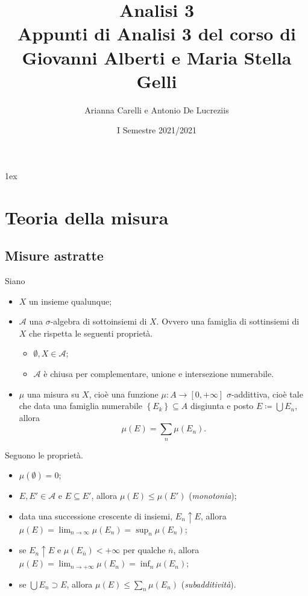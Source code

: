 \documentclass[a4paper, 11pt]{report}
\title{{\Huge Analisi 3}\\{\small Appunti di Analisi 3 del corso di Giovanni Alberti e Maria Stella Gelli}}
\author{Arianna Carelli e Antonio De Lucreziis}
\date{I Semestre 2021/2021}
\begin{document}
%
%
\parskip 1ex
\setlength{\parindent}{0pt}

\maketitle

\tableofcontents
\newpage

\chapter{Teoria della misura}

\section{Misure astratte}
Siano
\begin{itemize}
	\item $X$ un insieme qualunque;
	\item $\mathcal{A}$ una $\sigma$-algebra di sottoinsiemi di $X$. Ovvero una famiglia di sottinsiemi di $X$ che rispetta le seguenti proprietà.
		\begin{itemize}
			\item $\emptyset, X \in \mathcal{A}$;
			\item $\mathcal{A}$ è chiusa per complementare, unione e intersezione numerabile.
			\end{itemize}
	\item $\mu$ una misura su $X$, cioè una funzione $\mu \colon A \to [0,+\infty]$ $\sigma$-addittiva, cioè tale che data una famiglia numerabile $\left\{ E_k \right\} \subseteq A$ disgiunta e posto $E \coloneqq \bigcup E_n $, allora
	\[
		\mu(E) = \sum_{n} \mu (E_n).
	\] 
\end{itemize}
%
Seguono le proprietà.
\begin{itemize}
	\item $\mu(\emptyset) = 0$;
	\item $E,E' \in \mathcal{A}$ e $E \subseteq E'$, allora $\mu(E) \leq \mu(E')$ (\textit{monotonia});
	\item data una successione crescente di insiemi, $E_n \uparrow E$, allora $\mu(E) = \lim_{n \to \infty} \mu(E_n) = \sup_{n} \mu(E_n)$;
	\item se $E_n \uparrow E$ e $\mu (E_{\overline{n}}) < +\infty$ per qualche $\overline{n}$, allora $\mu(E) = \lim_{n \to + \infty} \mu(E_n) = \inf_{n} \mu(E_n)$;
	\item se $\bigcup E_n \supset E$, allora $\mu(E) \leq \sum_{n}^{} \mu(E_n)$ (\textit{subadditività}).
\end{itemize}
\end{document}
